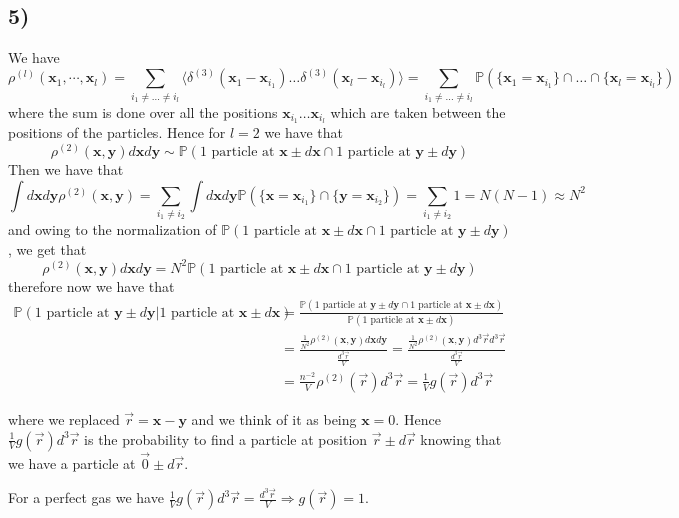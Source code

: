 \documentclass[10pt,a4paper]{book}
\begin{document}
\subsection*{5)}
We have 
$$\rho^{(l)}(\mathbf{x}_1,\cdots,\mathbf{x}_l)=\sum_{i_1\neq \ldots\neq i_l}\langle \delta^{(3)}(\mathbf{x}_1-\mathbf{x}_{i_1})\ldots\delta^{(3)}(\mathbf{x}_l-\mathbf{x}_{i_l})\rangle=\sum_{i_1\neq\ldots\neq i_l}\mathbb{P}(\{\mathbf{x}_1=\mathbf{x}_{i_1}\}\cap \ldots\cap\{\mathbf{x}_l=\mathbf{x}_{i_l}\})$$
where the sum is done over all the positions $\mathbf{x}_{i_1}\ldots\mathbf{x}_{i_l}$ which are taken between the positions of the particles. Hence for $l=2$ we have that 
$$\rho^{(2)}(\mathbf{x},\mathbf{y})d\mathbf{x}d\mathbf{y}\sim \mathbb{P}(\text{1 particle at }\mathbf{x}\pm d\mathbf{x}\cap \text{1 particle at }\mathbf{y}\pm d\mathbf{y})$$
Then we have that 
$$\int d\mathbf{x}d\mathbf{y}\rho^{(2)}(\mathbf{x},\mathbf{y})=\sum_{i_1\neq i_2}\int d\mathbf{x}d\mathbf{y}\mathbb{P}(\{\mathbf{x}=\mathbf{x}_{i_1}\}\cap\{\mathbf{y}=\mathbf{x}_{i_2}\})=\sum_{i_1\neq i_2} 1=N(N-1)\approx N^2$$
and owing to the normalization of $\mathbb{P}(\text{1 particle at }\mathbf{x}\pm d\mathbf{x}\cap \text{1 particle at }\mathbf{y}\pm d\mathbf{y})$, we get that
$$\rho^{(2)}(\mathbf{x},\mathbf{y})d\mathbf{x} d\mathbf{y}=N^2 \mathbb{P}(\text{1 particle at }\mathbf{x}\pm d\mathbf{x}\cap \text{1 particle at }\mathbf{y}\pm d\mathbf{y})$$
therefore now we have that
\begin{align*}
\mathbb{P}(\text{1 particle at }\mathbf{y}\pm d\mathbf{y}|\text{1 particle at }\mathbf{x}\pm d\mathbf{x})&=\frac{\mathbb{P}(\text{1 particle at }\mathbf{y}\pm d\mathbf{y}\cap \text{1 particle at }\mathbf{x}\pm d\mathbf{x})}{\mathbb{P}(\text{1 particle at }\mathbf{x}\pm d\mathbf{x})}\\
&=\frac{\frac{1}{N^2}\rho^{(2)}(\mathbf{x},\mathbf{y})d\mathbf{x}d\mathbf{y}}{\frac{d^3\vec{r}}{V}}=\frac{\frac{1}{N^2}\rho^{(2)}(\mathbf{x},\mathbf{y})d^3\vec{r}d^3\vec{r}}{\frac{d^3\vec{r}}{V}}\\
&=\frac{n^{-2}}{V}\rho^{(2)}(\vec{r})d^3\vec{r}=\frac{1}{V}g(\vec{r})d^3\vec{r}
\end{align*}

where we replaced $\vec{r}=\mathbf{x}-\mathbf{y}$ and we think of it as being $\mathbf{x}=0$. Hence $\frac{1}{V}g(\vec{r})d^3\vec{r}$ is the probability to find a particle at position $\vec{r}\pm d\vec{r}$ knowing that we have a particle at $\vec{0}\pm d\vec{r}$. 

For a perfect gas we have 
$\frac{1}{V}g(\vec{r})d^3\vec{r}=\frac{d^{3}\vec{r}}{V}\Rightarrow g(\vec{r})=1$.
\end{document}
